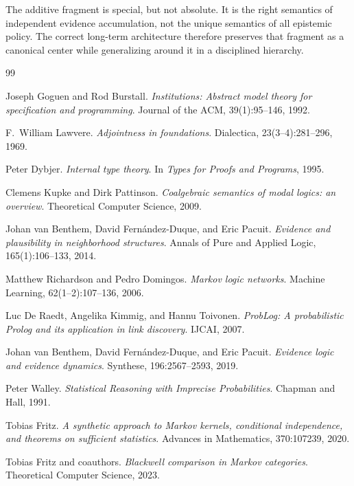 \documentclass[11pt]{article}
\begin{document}
The additive fragment is special, but not absolute.  It is the right semantics
of independent evidence accumulation, not the unique semantics of all epistemic
policy.  The correct long-term architecture therefore preserves that fragment as
a canonical center while generalizing around it in a disciplined hierarchy.

\begin{thebibliography}{99}

Joseph Goguen and Rod Burstall.
\newblock \emph{Institutions: Abstract model theory for specification and
programming}.
\newblock Journal of the ACM, 39(1):95--146, 1992.

F.~William Lawvere.
\newblock \emph{Adjointness in foundations}.
\newblock Dialectica, 23(3--4):281--296, 1969.

Peter Dybjer.
\newblock \emph{Internal type theory}.
\newblock In \emph{Types for Proofs and Programs}, 1995.

Clemens Kupke and Dirk Pattinson.
\newblock \emph{Coalgebraic semantics of modal logics: an overview}.
\newblock Theoretical Computer Science, 2009.

Johan van Benthem, David Fern{\'a}ndez-Duque, and Eric Pacuit.
\newblock \emph{Evidence and plausibility in neighborhood structures}.
\newblock Annals of Pure and Applied Logic, 165(1):106--133, 2014.

Matthew Richardson and Pedro Domingos.
\newblock \emph{Markov logic networks}.
\newblock Machine Learning, 62(1--2):107--136, 2006.

Luc De Raedt, Angelika Kimmig, and Hannu Toivonen.
\newblock \emph{ProbLog: A probabilistic Prolog and its application in link
 discovery}.
\newblock IJCAI, 2007.

Johan van Benthem, David Fern{\'a}ndez-Duque, and Eric Pacuit.
\newblock \emph{Evidence logic and evidence dynamics}.
\newblock Synthese, 196:2567--2593, 2019.

Peter Walley.
\newblock \emph{Statistical Reasoning with Imprecise Probabilities}.
\newblock Chapman and Hall, 1991.

Tobias Fritz.
\newblock \emph{A synthetic approach to Markov kernels, conditional
independence, and theorems on sufficient statistics}.
\newblock Advances in Mathematics, 370:107239, 2020.

Tobias Fritz and coauthors.
\newblock \emph{Blackwell comparison in Markov categories}.
\newblock Theoretical Computer Science, 2023.

\end{thebibliography}
\end{document}
